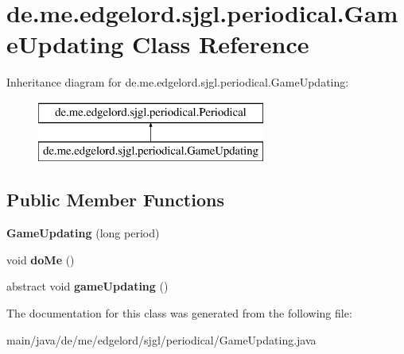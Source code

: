 \hypertarget{classde_1_1me_1_1edgelord_1_1sjgl_1_1periodical_1_1_game_updating}{}\section{de.\+me.\+edgelord.\+sjgl.\+periodical.\+Game\+Updating Class Reference}
\label{classde_1_1me_1_1edgelord_1_1sjgl_1_1periodical_1_1_game_updating}
Inheritance diagram for de.\+me.\+edgelord.\+sjgl.\+periodical.\+Game\+Updating\+:\begin{figure}[H]
\begin{center}
\leavevmode
\includegraphics[height=2.000000cm]{classde_1_1me_1_1edgelord_1_1sjgl_1_1periodical_1_1_game_updating}
\end{center}
\end{figure}
\subsection*{Public Member Functions}
\begin{DoxyCompactItemize}
\item 
\mbox{\label{classde_1_1me_1_1edgelord_1_1sjgl_1_1periodical_1_1_game_updating_a199a92a0e12eda02e4c55fca0ef345ce}} 
{\bfseries Game\+Updating} (long period)
\item 
\mbox{\label{classde_1_1me_1_1edgelord_1_1sjgl_1_1periodical_1_1_game_updating_afa0a67264abd9d27833f302a86061faa}} 
void {\bfseries do\+Me} ()
\item 
\mbox{\label{classde_1_1me_1_1edgelord_1_1sjgl_1_1periodical_1_1_game_updating_ab422b8e8dbf19ea67d31a862634cd42c}} 
abstract void {\bfseries game\+Updating} ()
\end{DoxyCompactItemize}


The documentation for this class was generated from the following file\+:\begin{DoxyCompactItemize}
\item 
main/java/de/me/edgelord/sjgl/periodical/Game\+Updating.\+java\end{DoxyCompactItemize}
